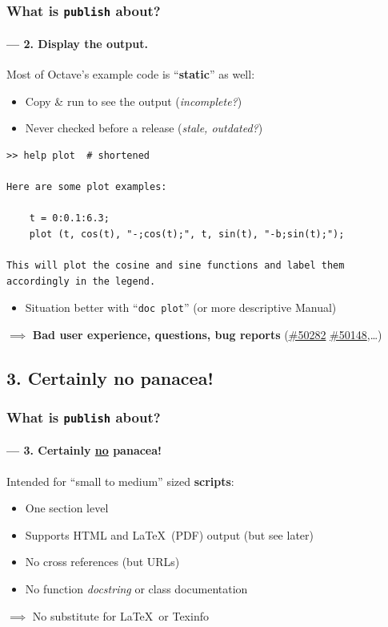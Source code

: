 \documentclass[xcolor=svgnames]{beamer}
\begin{document}
\begin{frame}[fragile]
\frametitle{What is \texttt{publish} about?}
\framesubtitle{--- 2. Display the output.}

Most of Octave's example code is ``\textbf{static}'' as well:
\begin{itemize}
\item Copy \& run to see the output (\textit{incomplete?})
\item Never checked before a release (\textit{stale, outdated?})
\end{itemize}

\begin{lstlisting}[language={}]
>> help plot  # shortened

Here are some plot examples:

    t = 0:0.1:6.3;
    plot (t, cos(t), "-;cos(t);", t, sin(t), "-b;sin(t);");

This will plot the cosine and sine functions and label them
accordingly in the legend.
\end{lstlisting}

\begin{itemize}
\item Situation better with ``\texttt{doc plot}'' (or more descriptive Manual)
\end{itemize}

$\implies$ \textbf{Bad user experience, questions, bug reports}
{\tiny (\href{https://savannah.gnu.org/bugs/index.php?50282}{\#50282}
\href{https://savannah.gnu.org/bugs/index.php?50148}{\#50148},\ldots)}
\end{frame}


\subsection{3. Certainly no panacea!}


\begin{frame}
\frametitle{What is \texttt{publish} about?}
\framesubtitle{--- 3. Certainly \underline{\textbf{no}} panacea!}

Intended for ``small to medium'' sized \textbf{scripts}:
\begin{itemize}\itemsep1em
\item One section level
\item Supports HTML and \LaTeX\ (PDF) output (but see later)
\item No cross references (but URLs)
\item No function \textit{docstring} or class documentation
\end{itemize}

\vfill

$\implies$ No substitute for \LaTeX\ or Texinfo
\end{frame}
\end{document}
